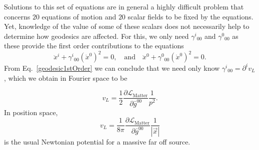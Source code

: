\documentclass[twocolumn,aps,showpacs,showkeys,prl,superscriptaddress]{revtex4-1}
\begin{document}
Solutions to this set of equations are in general a highly difficult problem that concerns $20$ equations of motion and $20$ scalar fields to be fixed by the equations. Yet, knowledge of the value of some of these scalars does not necessarily help to determine how geodesics are affected. For this, we only need $\gamma^i{}_{00}$ and $\gamma^0{}_{00}$ as these provide the first order contributions to the equations
\begin{equation}
  \label{geodesic1stOrder}
  \ddot{x}^i + \gamma^i{}_{00}(\dot{x}^0)^2 = 0,
  \quad \text{and} \quad
  \ddot{x}^0 + \gamma^0{}_{00}(\dot{x}^0)^2 = 0.
\end{equation}
From Eq.~\eqref{geodesic1stOrder} we can conclude that we need only know $\gamma^i{}_{00} = \partial^i v_L$, which we obtain in Fourier space to be

\begin{equation}
  v_L=\frac{1}{2}\frac{\partial\mathcal{L}_{\text{Matter}}}{\partial\bar{g}^{00}}\frac{1}{p^2}.
\end{equation}
In position space, 
\begin{equation}
  v_L = \frac{1}{8\pi} \frac{ \partial\mathcal{L}_{\text{Matter}} }{ \partial \bar{g}^{00} } \frac{1}{|\vec{x}|}
\end{equation}
is the usual Newtonian potential for a massive far off source.




\end{document}
